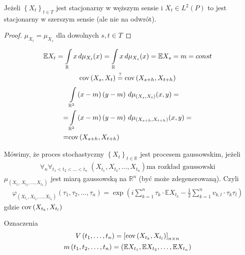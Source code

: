 \begin{twr}
Jeżeli $ \left\{X_t\right\} _{t\in T}$ jest stacjonarny w węższym sensie i $ X_t\in L^2(P) $ to jest stacjonarny w szerszym sensie (ale nie na odwrót).
\begin{proof}
$ \mu_{X_t}=\mu_{X_s} $ dla dowolnych $ s,t\in T $
\end{proof}
\begin{gather*}
\mathbb E X_t=
\int\limits_{\mathbb R }x\,d\mu_{X_t}(x)=
\int\limits_{\mathbb R }x\,d\mu_{X_s}(x)=
\mathbb E X_s=m=const\\
\text{cov} \left(X_s,X_t\right)\stackrel{?}{=}
\text{cov} \left(X_{s+h},X_{t+h}\right)
\end{gather*}
\begin{align*}
&\int\limits_{\mathbb R ^2}\left(x-m\right)\left(y-m\right)\,d\mu_{\left(X_s,X_t\right)}(x,y)
=\\=&
\int\limits_{\mathbb R ^2}\left(x-m\right)\left(y-m\right)\,d\mu_{\left(X_{s+h},X_{t+h}\right)}(x,y)
=\\=&
\text{cov} \left(X_{s+h},X_{t+h}\right)
\end{align*}
\end{twr}
\begin{defi}
Mówimy, że proces stochastyczny $ \left\{X_t\right\}_{t\in \mathbb R } $ jest procesem gaussowskim, jeżeli
\begin{gather*}
\forall_n\forall_{t_1<t_2<\dots<t_n}\;
\left(X_{t_1},X_{t_2},\dots,X_{t_n}\right) \text{ma rozkład gaussowski}
\end{gather*}
$ \mu_{\left(X_{t_1},X_{t_2},\dots,X_{t_n}\right)} $ jest miarą gaussowską na $ \mathbb R ^n $ (być może zdegenerowaną). Czyli
\begin{gather*}
\varphi_{\left(X_{t_1},X_{t_2},\dots,X_{t_n}\right)}(\tau_1,\tau_2,\dots,\tau_n)=
\exp\left(i\sum_{k=1}^{n}\tau_k\cdot \mathbb E X_{t_k}-\frac{1}{2}\sum_{k=1}^{n}v_{k,l}\cdot \tau_k\tau_l\right)
\end{gather*}
gdzie $ \text{cov} \left(X_{t_k},X_{t_l}\right) $
\end{defi}
Oznaczenia
\begin{gather*}
V\left(t_1,\dots,t_n\right)=\left[\text{cov} \left(X_{t_k},X_{t_l}\right)\right]_{n\times n}\\
m\left(t_1,t_2,\dots,t_n\right)=
\left(\mathbb E X_{t_1},\mathbb E X_{t_2},\dots,\mathbb E X_{t_n}\right)
\end{gather*}